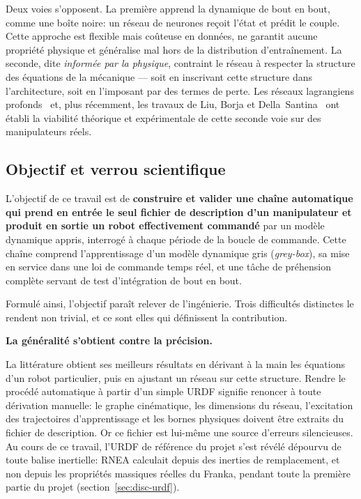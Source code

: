 \documentclass[a4paper, oneside]{article}
\newcommand{\parag}[1]{%
    \par\medskip\noindent\textbf{#1}\ \ignorespaces%
}
\begin{document}
Deux voies s'opposent. La première apprend la dynamique de bout en bout, comme
une boîte noire: un réseau de neurones reçoit l'état et prédit le couple.
Cette approche est flexible mais coûteuse en données, ne garantit aucune
propriété physique et généralise mal hors de la distribution d'entraînement. La
seconde, dite \emph{informée par la physique}, contraint le réseau à respecter
la structure des équations de la mécanique — soit en inscrivant cette structure
dans l'architecture, soit en l'imposant par des termes de perte. Les réseaux
lagrangiens profonds~\cite{lutter2019iclr} et, plus récemment, les travaux de
Liu, Borja et Della~Santina~\cite{liu2024} ont établi la viabilité théorique et
expérimentale de cette seconde voie sur des manipulateurs réels.

\subsection{Objectif et verrou scientifique}
\label{sec:verrou}

L'objectif de ce travail est de \textbf{construire et valider une chaîne
automatique qui prend en entrée le seul fichier de description d'un
manipulateur et produit en sortie un robot effectivement commandé} par un
modèle dynamique appris, interrogé à chaque période de la boucle de commande.
Cette chaîne comprend l'apprentissage d'un modèle dynamique gris
(\emph{grey-box}), sa mise en service dans une loi de commande temps réel, et
une tâche de préhension complète servant de test d'intégration de bout en bout.

Formulé ainsi, l'objectif paraît relever de l'ingénierie. Trois difficultés
distinctes le rendent non trivial, et ce sont elles qui définissent la
contribution.

\parag{La généralité s'obtient contre la précision.}
La littérature obtient ses meilleurs résultats en dérivant à la main les
équations d'un robot particulier, puis en ajustant un réseau sur cette
structure. Rendre le procédé automatique à partir d'un simple URDF signifie
renoncer à toute dérivation manuelle: le graphe cinématique, les dimensions du
réseau, l'excitation des trajectoires d'apprentissage et les bornes physiques
doivent être extraits du fichier de description. Or ce fichier est lui-même une
source d'erreurs silencieuses. Au cours de ce travail, l'URDF de référence du
projet s'est révélé dépourvu de toute balise inertielle: RNEA calculait depuis
des inerties de remplacement, et non depuis les propriétés massiques réelles du
Franka, pendant toute la première partie du projet
(section~\ref{sec:disc-urdf}).
\end{document}
